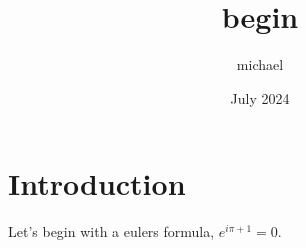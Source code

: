\documentclass{article}
\title{begin}
\author{michael}
\date{July 2024}
\begin{document}
\maketitle

\section*{Introduction}
Let's begin with a eulers formula, $e^{i\pi + 1} = 0$.
\end{document}
